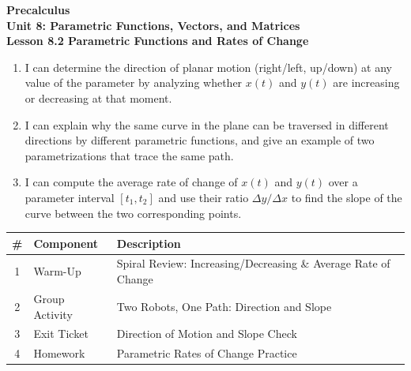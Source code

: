\documentclass[10pt]{article}
\begin{document}
\vspace{-0.8in}

\begin{center}
  {\color{white}\textbf{\LARGE Precalculus}}\\[4pt]
  {\color{skymid}\large\textbf{Unit 8: Parametric Functions, Vectors, and Matrices}}\\[6pt]
  {\color{white}\textbf{\large Lesson 8.2 \quad Parametric Functions and Rates of Change}}
\end{center}

\vspace{0.22in}
\namedateperiod
\vspace{0.18in}

\begin{learningtargetbox}
\small
\begin{enumerate}[leftmargin=1.5em, itemsep=5pt]
  \item I can determine the direction of planar motion (right/left, up/down)
    at any value of the parameter by analyzing whether $x(t)$ and $y(t)$
    are increasing or decreasing at that moment.
  \item I can explain why the same curve in the plane can be traversed in
    different directions by different parametric functions, and give an
    example of two parametrizations that trace the same path.
  \item I can compute the average rate of change of $x(t)$ and $y(t)$ over
    a parameter interval $[t_1, t_2]$ and use their ratio
    $\Delta y / \Delta x$ to find the slope of the curve between the two
    corresponding points.
\end{enumerate}
\end{learningtargetbox}

\vspace{0.14in}

\begin{tocbox}
\small
\renewcommand{\arraystretch}{1.5}
\begin{tabularx}{\linewidth}{@{} c l X @{}}
\rowcolor{sky}
\textbf{\#} & \textbf{Component} & \textbf{Description} \\
\midrule
1 & Warm-Up        & Spiral Review: Increasing/Decreasing \& Average Rate of Change \\
2 & Group Activity & Two Robots, One Path: Direction and Slope \\
3 & Exit Ticket    & Direction of Motion and Slope Check \\
4 & Homework       & Parametric Rates of Change Practice \\
\end{tabularx}
\end{tocbox}
\end{document}
